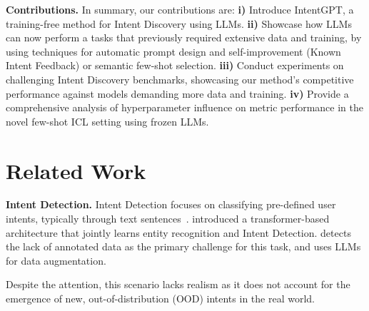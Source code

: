 \documentclass[11pt]{article}
\begin{document}
\textbf{Contributions.} In summary, our contributions are: \textbf{i)} Introduce IntentGPT, a training-free method for Intent Discovery using LLMs. \textbf{ii)} Showcase how LLMs can now perform a tasks that previously required extensive data and training, by using techniques for automatic prompt design and self-improvement (Known Intent Feedback) or semantic few-shot selection. \textbf{iii)} Conduct experiments on challenging Intent Discovery benchmarks, showcasing our method's competitive performance against models demanding more data and training. \textbf{iv)} Provide a comprehensive analysis of hyperparameter influence on metric performance in the novel few-shot ICL setting using frozen LLMs.


\section{Related Work}\label{related-work}


\textbf{Intent Detection.} Intent Detection focuses on classifying pre-defined user intents, typically through text sentences~\citep{liu2019review}. \citet{bunk2020diet} introduced a transformer-based~\citep{vaswani2017attention} architecture that jointly learns entity recognition and Intent Detection. \citet{lin2023selective} detects the lack of annotated data as the primary challenge for this task, and uses LLMs for data augmentation. 


Despite the attention, this scenario lacks realism as it does not account for the emergence of new, out-of-distribution (OOD) intents in the real world.
\end{document}
